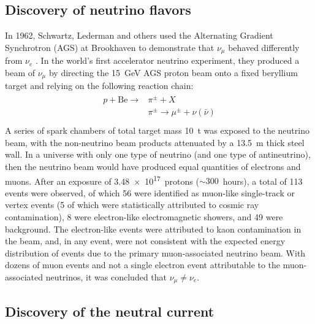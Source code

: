 \subsection{Discovery of neutrino flavors}
\label{subsec:nu_flavors}

In 1962, Schwartz, Lederman and others used the
Alternating Gradient Synchrotron (AGS) at Brookhaven
to demonstrate that $\nu_\mu$ behaved differently from $\nu_e$
\cite{numu_vs_nue}.
In the world's first accelerator neutrino experiment,
they produced a beam of $\nu_\mu$ by directing
the \SI{15}{\GeV} AGS proton beam
onto a fixed beryllium target and relying on the following reaction chain:
\begin{align}\label{eq:accel_reaction_chain}
    \begin{split}
        p + \text{Be} \to &\pi^{\pm} + X \\
        &\pi^{\pm} \to \mu^{\pm} + \nu(\bar{\nu}) \\
    \end{split}
\end{align}
A series of spark chambers of total target mass \SI{10}{\tonne}
was exposed to the neutrino beam,
with the non-neutrino beam products attenuated
by a \SI{13.5}{\m} thick steel wall.
In a universe with only one type of neutrino (and one type of antineutrino),
then the neutrino beam would have produced equal quantities
of electrons and muons.
After an exposure of \num{3.48e17}~protons ($\sim300$~hours),
a total of 113 events were observed,
of which 56 were identified as muon-like single-track or vertex events
(5 of which were statistically attributed to cosmic ray contamination),
8 were electron-like electromagnetic showers, and 49 were background.
The electron-like events were attributed to
kaon contamination in the beam,
and, in any event, were not consistent with the
expected energy distribution of events due to the
primary muon-associated neutrino beam.
With dozens of muon events and not a single electron event
attributable to the muon-associated neutrinos,
it was concluded that $\nu_\mu \neq \nu_e$.


\subsection{Discovery of the neutral current}
\label{subsec:neutral_current}

